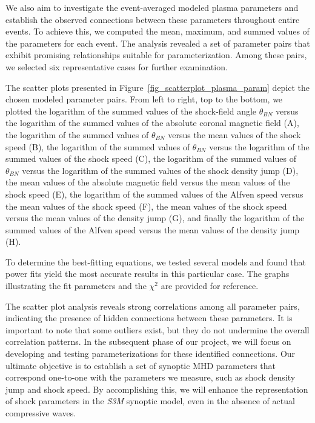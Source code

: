 We also aim to investigate the event-averaged modeled plasma parameters and establish the observed connections between these parameters throughout entire events. To achieve this, we computed the mean, maximum, and summed values of the parameters for each event. The analysis revealed a set of parameter pairs that exhibit promising relationships suitable for parameterization. Among these pairs, we selected six representative cases for further examination.

The scatter plots presented in Figure~\ref{fig_scatterplot_plasma_param} depict the chosen modeled parameter pairs. From left to right, top to the bottom, we plotted the logarithm of the summed values of the shock-field angle $\theta_{BN}$ versus the logarithm of the summed values of the absolute coronal magnetic field (A), the logarithm of the summed values of $\theta_{BN}$ versus the mean values of the shock speed (B), the logarithm of the summed values of $\theta_{BN}$ versus the logarithm of the summed values of the shock speed (C), the logarithm of the summed values of $\theta_{BN}$ versus the logarithm of the summed values of the shock density jump (D), the mean values of the absolute magnetic field versus the mean values of the shock speed (E), the logarithm of the summed values of the Alfven speed versus the mean values of the shock speed (F), the mean values of the shock speed versus the mean values of the density jump (G), and finally the logarithm of the summed values of the Alfven speed versus the mean values of the density jump (H).

To determine the best-fitting equations, we tested several models and found that power fits yield the most accurate results in this particular case. The graphs illustrating the fit parameters and the $\chi^2$ are provided for reference.

The scatter plot analysis reveals strong correlations among all parameter pairs, indicating the presence of hidden connections between these parameters. It is important to note that some outliers exist, but they do not undermine the overall correlation patterns.
In the subsequent phase of our project, we will focus on developing and testing parameterizations for these identified connections. Our ultimate objective is to establish a set of synoptic MHD parameters that correspond one-to-one with the parameters we measure, such as shock density jump and shock speed. By accomplishing this, we will enhance the representation of shock parameters in the \textit{S3M} synoptic model, even in the absence of actual compressive waves.

